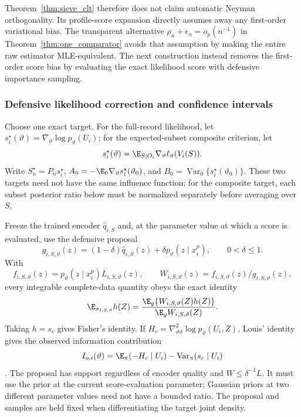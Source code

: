 Theorem~\ref{thm:sieve_clt} therefore does not claim automatic Neyman
orthogonality.  Its profile-score expansion directly assumes away any
first-order variational bias.  The transparent alternative
$\rho_n+\epsilon_n=o_p(n^{-1})$ in
Theorem~\ref{thm:one_comparator} avoids that assumption by making the entire
raw estimator MLE-equivalent.  The next construction instead removes the
first-order score bias by evaluating the exact likelihood score with defensive
importance sampling.

\subsubsection{Defensive likelihood correction and confidence intervals}
\label{subsubsec:defensive_one_step}

Choose one exact target.  For the full-record likelihood, let
$s_i^\star(\vartheta)=\nabla_\vartheta\log p_\vartheta(U_i)$; for the
expected-subset composite criterion, let
\[
 s_i^\star(\vartheta)
 =\E_{S\mid O_i}\nabla_\vartheta\ell_\vartheta(V_i(S)).
\]
Write $S_n^\star=P_ns_i^\star$,
$A_0=-\E_0\nabla_\vartheta s_i^\star(\vartheta_0)$, and
$B_0=\operatorname{Var}_0\{s_i^\star(\vartheta_0)\}$.  These two targets need
not have the same influence function; for the composite target, each subset
posterior ratio below must be normalized separately before averaging over
$S$.

Freeze the trained encoder $\widehat q_{i,S}$ and, at the parameter value at
which a score is evaluated, use the defensive proposal
\begin{equation}
 g_{i,S,\vartheta}(z)
 =(1-\delta)\widehat q_{i,S}(z)
  +\delta p_\vartheta(z\mid x_i^p),\qquad0<\delta\leq1.
 \label{eq:defensive_proposal}
\end{equation}
With
\[
 f_{i,S,\vartheta}(z)
 =p_\vartheta(z\mid x_i^p)L_{i,S,\vartheta}(z),\qquad
 W_{i,S,\vartheta}(z)=f_{i,S,\vartheta}(z)/g_{i,S,\vartheta}(z),
\]
every integrable complete-data quantity obeys the exact identity
\begin{equation}
 \E_{\pi_{i,S,\vartheta}}h(Z)
 =\frac{\E_g\{W_{i,S,\vartheta}(Z)h(Z)\}}
        {\E_g W_{i,S,\vartheta}(Z)}.
 \label{eq:defensive_posterior_identity}
\end{equation}
Taking $h=s_c$ gives Fisher's identity.  If
$H_c=\nabla_{\vartheta\vartheta}^2\log p_\vartheta(U_i,Z)$, Louis' identity
gives the observed information contribution
\begin{equation}
 I_{o,i}(\vartheta)
 =\E_\pi(-H_c\mid U_i)-\operatorname{Var}_\pi(s_c\mid U_i)
 \label{eq:louis_identity_defensive}
\end{equation}
\citep{Louis1982}.  The proposal has support regardless of encoder quality and
$W\leq\delta^{-1}L$.  It must use the prior at the current score-evaluation
parameter; Gaussian priors at two different parameter values need not have a
bounded ratio.  The proposal and samples are held fixed when differentiating
the target joint density.

